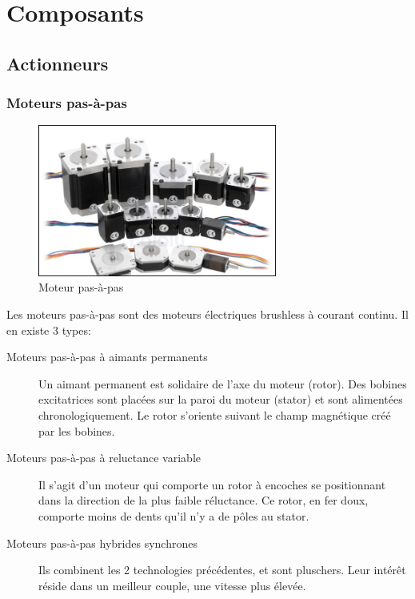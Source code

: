 \documentclass[a4paper, 11pt]{report}
\begin{document}
\part{Composants}

\chapter{Actionneurs}

\section{Moteurs pas-à-pas}

\begin{figure}[h]
\begin{centering}
\includegraphics[width=0.7\textwidth]{images/MoteurPasAPas.png}
\caption{Moteur pas-à-pas}
\par\end{centering}
\end{figure}

Les moteurs pas-à-pas sont des moteurs électriques brushless à courant continu. Il en existe 3 types:
\begin{description}
\item[Moteurs pas-à-pas à aimants permanents] Un aimant permanent est solidaire de l'axe du moteur (rotor). Des bobines excitatrices sont placées sur la paroi du moteur (stator) et sont alimentées chronologiquement. Le rotor s'oriente suivant le champ magnétique créé par les bobines.
\item[Moteurs pas-à-pas à reluctance variable] Il s'agit d'un moteur qui comporte un rotor à encoches se positionnant dans la direction de la plus faible réluctance. Ce rotor, en fer doux, comporte moins de dents qu'il n'y a de pôles au stator.
\item[Moteurs pas-à-pas hybrides synchrones]Ils combinent les 2 technologies précédentes, et sont pluschers. Leur intérêt réside dans un meilleur couple, une vitesse plus élevée.
\end{description}
\end{document}
